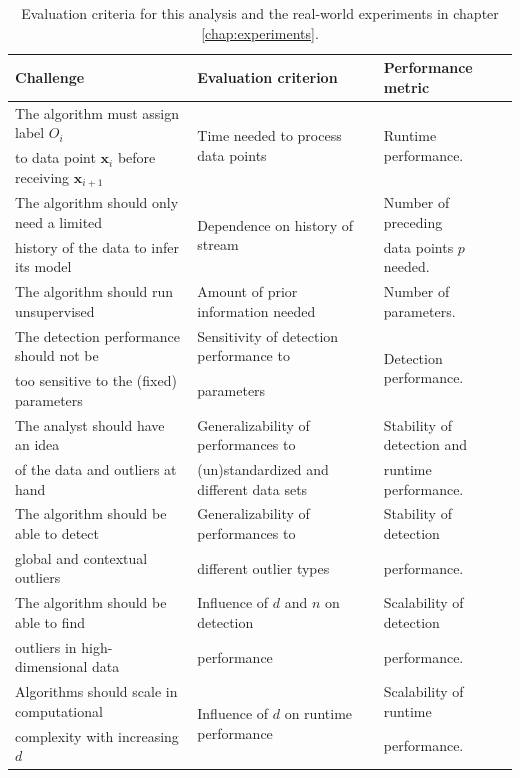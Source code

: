 \begin{table}[h]
	\centering
	\hspace{-0.5cm}
	\vspace{-0.25cm}
	\caption{Evaluation criteria for this analysis and the real-world experiments in chapter \ref{chap:experiments}.}
	\label{tab:analysis_evaluation}
	\small
	\begin{tabular}{l l l}
		\toprule
		\textbf{Challenge} & \textbf{Evaluation criterion} & \textbf{Performance metric}\\ \midrule
		The algorithm must assign label $O_i$ 		& 	\multirow{2}{*}{Time needed to process data points} &  \multirow{2}{*}{Runtime performance.}	\\
		to data point $\mathbf{x}_i$ before receiving $\mathbf{x}_{i+1}$	& 	&		 \\[0.15cm]
		The algorithm should only need a limited	& \multirow{2}{*}{Dependence on history of stream} & Number of preceding  \\
		history of the data to infer its model & & data points $p$ needed. \\[0.15cm]
		
		The algorithm should run unsupervised & Amount of prior information needed & Number of parameters.\\[0.15cm]
		The detection performance should not be & Sensitivity of detection	performance to & \multirow{2}{*}{Detection performance.} \\
		too sensitive to the (fixed) parameters & parameters &  \\ \midrule
		
		The analyst should have an idea 	& Generalizability of performances to  & Stability of detection and \\
		of the data and outliers at hand 	& (un)standardized and different data sets & runtime performance. \\[0.15cm]
		The algorithm should be able to detect & Generalizability of performances to	& Stability of detection  \\
		global and contextual outliers & different outlier types 			& performance. \\ \midrule
		
		The algorithm should be able to find 	& Influence of $d$ and $n$ on detection		& Scalability of detection \\
		outliers in high-dimensional data 		& performance 			& performance. \\[0.15cm]
		Algorithms should scale in computational &	\multirow{2}{*}{Influence of $d$ on	runtime performance} & Scalability of runtime \\
		complexity with increasing $d$ 	& 		& performance.\\ \bottomrule		
	\end{tabular}
\vspace{-0.3cm}
\end{table}

